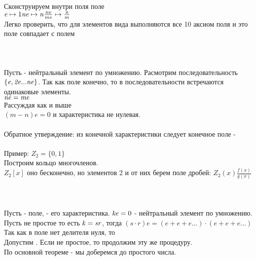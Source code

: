 Сконструируем внутри поля  поле  \\
$\mathit {e} \mapsto 1 \\
\mathit {ne} \mapsto \mathit {n} \\
\frac{ne}{me} \mapsto \frac{n}{m}$ \\

Легко проверить, что для элементов вида  выполняются все 10 аксиом поля и это поле совпадает с полем  \\

\\
 \\

 \\
Пусть  - нейтральный элемент по умножению. Расмотрим последовательность $\mathit {\{e,2e...ne\}}$. Так как поле конечно, то в последовательности встречаются одинаковые элементы.\\
$\mathit{ne=me}$ \\
Рассуждая как и выше \\
$\mathit {(m-n)e=0}$ и характеристика не нулевая. \\

 \\
Обратное утверждение: из конечной характеристики следует конечное поле -  \\

\\
Пример: $Z_{2} = \{0,1\}$ \\
Построим кольцо многочленов. \\
$Z_{2}[x]$ оно бесконечно, но элементов 2 и от них берем поле дробей:
$Z_{2}(x) \frac{f(x)}{g(x)}$ \\

 \\
 \\

  \\
Пусть  - поле,  - его характеристика. $\mathit{ke}=0$  - нейтральный элемент по умножению. Пусть  не простое то есть $\mathit {k=sr}$, тогда $(s \cdot r)e = (e+e+e...) \cdot (e+e+e...)$ \\
Так как в поле нет делителя нуля, то  \\
Допустим . Если  не простое, то продолжим эту же процедуру.\\
По основной теореме - мы доберемся до простого числа. \\

